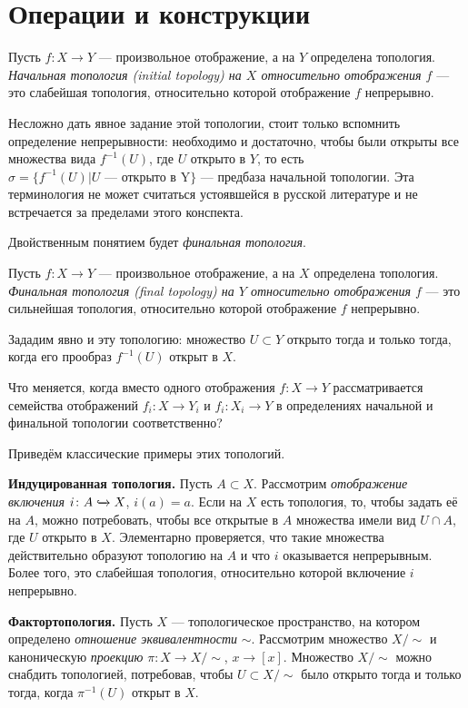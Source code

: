 \section{Операции и конструкции}
\begin{defin}
	Пусть $f\colon X\to Y$ --- произвольное отображение, а на $Y$ определена топология. \textit{Начальная топология (initial topology) на $X$ относительно отображения $f$} --- это слабейшая топология, относительно которой отображение $f$ непрерывно.
\end{defin}
Несложно дать явное задание этой топологии, стоит только вспомнить определение непрерывности: необходимо и достаточно, чтобы были открыты все множества вида $f^{-1}(U)$, где $U$ открыто в $Y$, то есть $\sigma=\{f^{-1}(U)|U\text{ --- открыто в Y}\}$ --- предбаза начальной топологии. Эта терминология не может считаться устоявшейся в русской литературе и не встречается за пределами этого конспекта.

Двойственным понятием будет \textit{финальная топология}.
\begin{defin}
	Пусть $f\colon X\to Y$ --- произвольное отображение, а на $X$ определена топология. \textit{Финальная топология (final topology) на $Y$ относительно отображения $f$} --- это сильнейшая топология, относительно которой отображение $f$ непрерывно.
\end{defin}
Зададим явно и эту топологию: множество $U\subset Y$ открыто тогда и только тогда, когда его прообраз $f^{-1}(U)$ открыт в $X$.
\begin{quest}
	Что меняется, когда вместо одного отображения $f\colon X\to Y$ рассматривается семейства отображений $f_i\colon X\to Y_i$ и $f_i\colon X_i\to Y$ в определениях начальной и финальной топологии соответственно?
\end{quest}
Приведём классические примеры этих топологий.

\textbf{Индуцированная топология.} Пусть $A\subset X$. Рассмотрим \textit{отображение включения} $i\colon A\xhookrightarrow{} X$, $i(a)=a$. Если на $X$ есть топология, то, чтобы задать её на $A$, можно потребовать, чтобы все открытые в $A$ множества имели вид $U\cap A$, где $U$ открыто в $X$. Элементарно проверяется, что такие множества действительно образуют топологию на $A$ и что $i$ оказывается непрерывным. Более того, это слабейшая топология, относительно которой включение $i$ непрерывно.

\textbf{Фактортопология.} Пусть $X$ --- топологическое пространство, на котором определено \textit{отношение эквивалентности} $\sim$. Рассмотрим множество $X/\sim$ и каноническую \textit{проекцию} $\pi\colon X\to X/\sim$, $x\to[x]$. Множество $X/\sim$ можно снабдить топологией, потребовав, чтобы $U\subset X/\sim$ было открыто тогда и только тогда, когда $\pi^{-1}(U)$ открыт в $X$.

